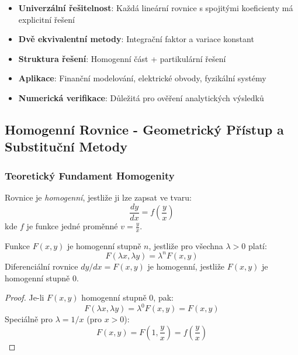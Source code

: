 \begin{itemize}
\item \textbf{Univerzální řešitelnost}: Každá lineární rovnice s spojitými koeficienty má explicitní řešení
\item \textbf{Dvě ekvivalentní metody}: Integrační faktor a variace konstant
\item \textbf{Struktura řešení}: Homogenní část + partikulární řešení
\item \textbf{Aplikace}: Finanční modelování, elektrické obvody, fyzikální systémy
\item \textbf{Numerická verifikace}: Důležitá pro ověření analytických výsledků
\end{itemize}

\subsection{Homogenní Rovnice - Geometrický Přístup a Substituční Metody}
\label{subsec:homogenni-rovnice}

\subsubsection{Teoretický Fundament Homogenity}
\label{subsubsec:teoreticky-fundament-homogenni}

\begin{definition}
Rovnice je \emph{homogenní}, jestliže ji lze zapsat ve tvaru:
\[
\frac{dy}{dx} = f\left(\frac{y}{x}\right)
\]
kde $f$ je funkce jedné proměnné $v = \frac{y}{x}$.
\end{definition}

\vspace{0.6\baselineskip}

\begin{theorem}
Funkce $F(x, y)$ je homogenní stupně $n$, jestliže pro všechna $\lambda > 0$ platí:
\[
F(\lambda x, \lambda y) = \lambda^n F(x, y)
\]
Diferenciální rovnice $dy/dx = F(x, y)$ je homogenní, jestliže $F(x, y)$ je homogenní stupně 0.
\end{theorem}

\vspace{0.4\baselineskip}

\begin{proof}
Je-li $F(x, y)$ homogenní stupně 0, pak:
\[
F(\lambda x, \lambda y) = \lambda^0 F(x, y) = F(x, y)
\]
Speciálně pro $\lambda = 1/x$ (pro $x > 0$):
\[
F(x, y) = F\left(1, \frac{y}{x}\right) = f\left(\frac{y}{x}\right)
\]
\end{proof}

